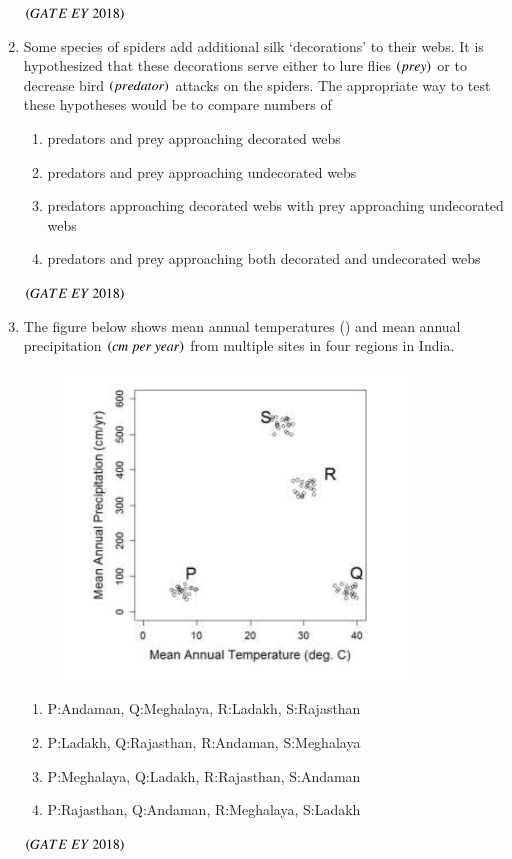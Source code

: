\documentclass[journal]{IEEEtran}
\numberwithin{equation}{enumi}
\numberwithin{figure}{enumi}
\begin{document}
\begin{enumerate}
    \hfill{$\brak{ GATE\ EY\ 2018}$}
    \bigskip
\item Some species of spiders add additional silk `decorations' to their webs. It is
hypothesized that these decorations serve either to lure flies $\left(prey\right)$ or to decrease
bird $\left(predator\right)$ attacks on the spiders. The appropriate way to test these hypotheses
would be to compare numbers of
    \begin{enumerate}
        \item predators and prey approaching decorated webs
        \item  predators and prey approaching undecorated webs 
        \item predators approaching decorated webs with prey approaching undecorated webs 
        \item  predators and prey approaching both decorated and undecorated webs
    \end{enumerate}
    \hfill{$\brak{ GATE\ EY\ 2018}$}
    \bigskip
\item The figure below shows mean annual temperatures (\textcelsius) and mean annual
precipitation $\brak{cm\ per\ year}$ from multiple sites in four regions in India.
\begin{figure}[!ht]
    \centering
    \includegraphics[width=0.5\columnwidth]{figs/5.png}
    \caption{}
    \label{fig:5}
   \end{figure}
    \begin{enumerate}
        \item P:Andaman, Q:Meghalaya, R:Ladakh, S:Rajasthan
        \item P:Ladakh, Q:Rajasthan, R:Andaman, S:Meghalaya
        \item P:Meghalaya, Q:Ladakh, R:Rajasthan, S:Andaman
        \item P:Rajasthan, Q:Andaman, R:Meghalaya, S:Ladakh
    \end{enumerate}
    \hfill{$\brak{ GATE\ EY\ 2018}$}
    \bigskip

\end{enumerate}
\end{document}
